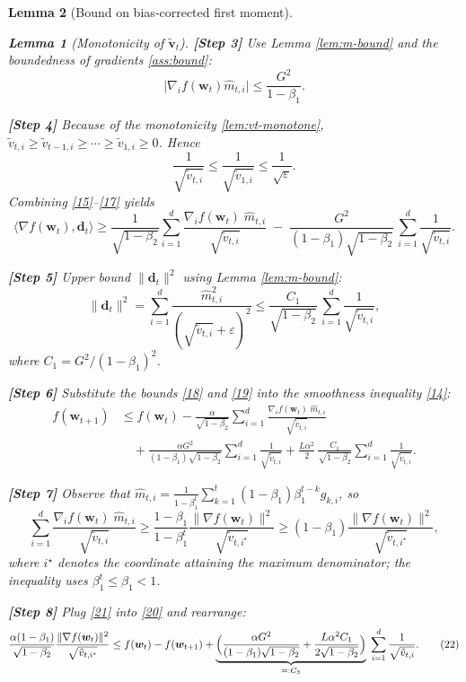 \documentclass{article}
\newtheorem{lemma}{Lemma}
\begin{document}
\begin{lemma}[Bound on bias‑corrected first moment]
\begin{lemma}[Monotonicity of $\tilde{\bm v}_{t}$]
\noindent\textbf{[Step 3]} Use Lemma \ref{lem:m-bound} and the boundedness
of gradients \eqref{ass:bound}:
\[
\bigl|\nabla_{i}f(\bm{w}_{t})\hat m_{t,i}\bigr|
\le \frac{G^{2}}{1-\beta_{1}}.
\tag{16}
\]

\noindent\textbf{[Step 4]} Because of the monotonicity \eqref{lem:vt-monotone},
$\tilde v_{t,i}\ge\tilde v_{t-1,i}\ge\cdots\ge\tilde v_{1,i}\ge0$.
Hence
\[
\frac{1}{\sqrt{\tilde v_{t,i}}}\le\frac{1}{\sqrt{\tilde v_{1,i}}}
\le\frac{1}{\sqrt{\varepsilon}}.
\tag{17}
\]
Combining \eqref{15}–\eqref{17} yields
\[
\langle\nabla f(\bm{w}_{t}),\bm{d}_{t}\rangle
\ge
\frac{1}{\sqrt{1-\beta_{2}}}
\sum_{i=1}^{d}
\frac{\nabla_{i}f(\bm{w}_{t})\;\hat m_{t,i}}{\sqrt{\tilde v_{t,i}}}
\;-\;
\frac{G^{2}}{(1-\beta_{1})\sqrt{1-\beta_{2}}}\,
\sum_{i=1}^{d}\frac{1}{\sqrt{\tilde v_{t,i}}}.
\tag{18}
\]

\noindent\textbf{[Step 5]} Upper bound $\|\bm{d}_{t}\|^{2}$ using
Lemma \ref{lem:m-bound}:
\[
\|\bm{d}_{t}\|^{2}
= \sum_{i=1}^{d}
\frac{\hat m_{t,i}^{2}}{(\sqrt{\tilde v_{t,i}}+\varepsilon)^{2}}
\le
\frac{C_{1}}{\sqrt{1-\beta_{2}}}\,
\sum_{i=1}^{d}\frac{1}{\sqrt{\tilde v_{t,i}}},
\tag{19}
\]
where $C_{1}=G^{2}/(1-\beta_{1})^{2}$.

\noindent\textbf{[Step 6]} Substitute the bounds \eqref{18} and \eqref{19}
into the smoothness inequality \eqref{14}:
\[
\begin{aligned}
f(\bm{w}_{t+1})
&\le f(\bm{w}_{t})
-\frac{\alpha}{\sqrt{1-\beta_{2}}}
\sum_{i=1}^{d}
\frac{\nabla_{i}f(\bm{w}_{t})\;\hat m_{t,i}}{\sqrt{\tilde v_{t,i}}}
\\
&\quad
+\frac{\alpha G^{2}}{(1-\beta_{1})\sqrt{1-\beta_{2}}}
\sum_{i=1}^{d}\frac{1}{\sqrt{\tilde v_{t,i}}}
+\frac{L\alpha^{2}}{2}\,
\frac{C_{1}}{\sqrt{1-\beta_{2}}}
\sum_{i=1}^{d}\frac{1}{\sqrt{\tilde v_{t,i}}}.
\end{aligned}
\tag{20}
\]

\noindent\textbf{[Step 7]} Observe that
$\hat m_{t,i}= \frac{1}{1-\beta_{1}^{t}}\sum_{k=1}^{t}
(1-\beta_{1})\beta_{1}^{t-k} g_{k,i}$,
so
\[
\sum_{i=1}^{d}
\frac{\nabla_{i}f(\bm{w}_{t})\;\hat m_{t,i}}{\sqrt{\tilde v_{t,i}}}
\ge
\frac{1-\beta_{1}}{1-\beta_{1}^{t}}
\frac{\|\nabla f(\bm{w}_{t})\|^{2}}{\sqrt{\tilde v_{t,i^{\star}}}}
\ge
(1-\beta_{1})\frac{\|\nabla f(\bm{w}_{t})\|^{2}}{\sqrt{\tilde v_{t,i^{\star}}}},
\tag{21}
\]
where $i^{\star}$ denotes the coordinate attaining the
maximum denominator; the inequality uses $\beta_{1}^{t}\le\beta_{1}<1$.

\noindent\textbf{[Step 8]} Plug \eqref{21} into \eqref{20} and rearrange:
\[
\frac{\alpha(1-\beta_{1})}{\sqrt{1-\beta_{2}}}
\frac{\|\nabla f(\bm{w}_{t})\|^{2}}{\sqrt{\tilde v_{t,i^{\star}}}}
\le
f(\bm{w}_{t})-f(\bm{w}_{t+1})
+\underbrace{\Bigl(
\frac{\alpha G^{2}}{(1-\beta_{1})\sqrt{1-\beta_{2}}}
+\frac{L\alpha^{2}C_{1}}{2\sqrt{1-\beta_{2}}}
\Bigr)}_{=:C_{3}}\;
\sum_{i=1}^{d}\frac{1}{\sqrt{\tilde v_{t,i}}}.
\tag{22}
\]


\end{lemma}
\end{lemma}
\end{document}
